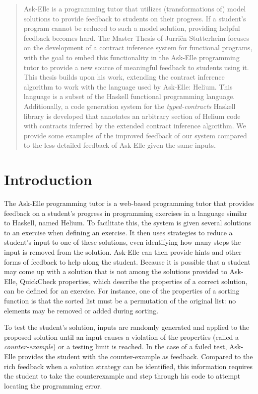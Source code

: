 \documentclass[10pt]{report}
\begin{document}
\begin{abstract}
Ask-Elle \cite{Gerdes:2012:phd} is a programming tutor that utilizes (transformations of) model solutions to provide feedback to students on their progress.
If a student's program cannot be reduced to such a model solution, providing helpful feedback becomes hard. 
The Master Thesis of Jurri\"en Stutterheim \cite{Stutterheim:2013:thesis} focuses on the development of a contract inference system for functional programs, with the goal to embed this functionality in the Ask-Elle programming tutor to provide a new source of meaningful feedback to students using it.
This thesis builds upon his work, extending the contract inference algorithm to work with the language used by Ask-Elle: Helium.
This language is a subset of the Haskell functional programming language.
Additionally, a code generation system  for the \textit{typed-contracts} Haskell library is developed that annotates an arbitrary section of Helium code with contracts inferred by the extended contract inference algorithm.
We provide some examples of the improved feedback of our system compared to the less-detailed feedback of Ask-Elle given the same inputs.
\end{abstract}

\tableofcontents

\chapter{Introduction}

The Ask-Elle \cite{Gerdes:2012:phd} programming tutor is a web-based programming tutor that provides feedback on a student's progress in programming exercises in a language similar to Haskell, named Helium.
To facilitate this, the system is given several solutions to an exercise when defining an exercise.
It then uses strategies to reduce a student's input to one of these solutions, even identifying how many steps the input is removed from the solution.
Ask-Elle can then provide hints and other forms of feedback to help along the student.
Because it is possible that a student may come up with a solution that is not among the solutions provided to Ask-Elle, QuickCheck \cite{Claessen:2000p592} properties, which describe the properties of a correct solution, can be defined for an exercise.
For instance, one of the properties of a sorting function is that the sorted list must be a permutation of the original list: no elements may be removed or added during sorting.


To test the student's solution, inputs are randomly generated and applied to the proposed solution until an input causes a violation of the properties (called a \textit{counter-example}) or a testing limit is reached.
In the case of a failed test, Ask-Elle provides the student with the counter-example as feedback.
Compared to the rich feedback when a solution strategy can be identified, this information requires the student to take the counterexample and step through his code to attempt locating the programming error.
\end{document}
